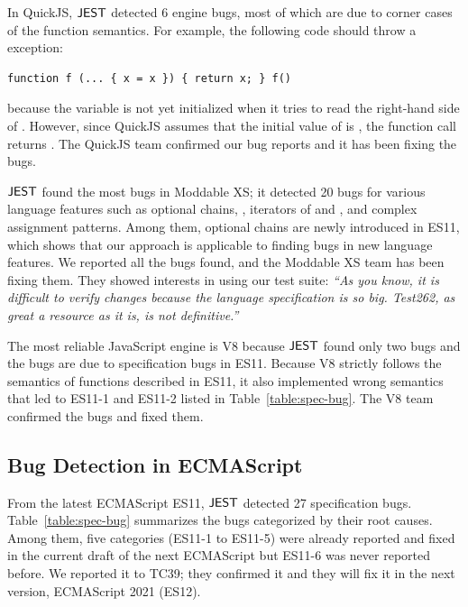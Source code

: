 In QuickJS, $\tool$ detected 6 engine bugs, most of which are due to corner cases of
the function semantics.  For example, the following code should throw
a  exception:
\begin{lstlisting}[style=myJSstyle]
    function f (... { x = x }) { return x; } f()
\end{lstlisting}
because the variable  is not yet initialized when it tries to
read the right-hand side of .
However, since QuickJS assumes that the initial value of  is
, the function call  returns .
The QuickJS team confirmed our bug reports and it has been fixing the bugs.

$\tool$ found the most bugs in Moddable XS; it detected 20 bugs for various
language features such as optional chains, ,
iterators of  and , and complex assignment patterns.
Among them, optional chains are newly introduced in ES11, which shows that
our approach is applicable to finding bugs in new language features.
We reported all the bugs found, and the Moddable XS team has been
fixing them.  They showed interests in using our test suite:
\emph{``As you know, it is difficult to verify changes because the language specification
is so big. Test262, as great a resource as it is, is not definitive.''}

The most reliable JavaScript engine is V8 because $\tool$ found only two bugs and
the bugs are due to specification bugs in ES11.  Because V8 strictly follows the
semantics of functions described in ES11, it also implemented wrong semantics
that led to ES11-1 and ES11-2 listed in Table~\ref{table:spec-bug}.
The V8 team confirmed the bugs and fixed them.

\subsection{Bug Detection in ECMAScript}
From the latest ECMAScript ES11, $\tool$ detected 27 specification bugs.
Table~\ref{table:spec-bug} summarizes the bugs categorized by their root causes.
Among them, five categories (ES11-1 to ES11-5) were already reported and fixed in the current
draft of the next ECMAScript but ES11-6 was never reported before.
We reported it to TC39; they confirmed it and they will
fix it in the next version, ECMAScript 2021 (ES12).

